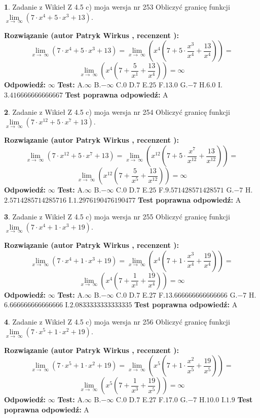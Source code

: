 \documentclass[12pt, a4paper]{article}
\theoremstyle{definition} %
\newtheorem{zad}{}
\newcommand{\zadStart}[1]{\begin{zad}#1\newline}
\newcommand{\zadStop}{\end{zad}}
\newcommand{\rozwStart}[2]{\noindent \textbf{Rozwiązanie (autor #1 , recenzent #2): }\newline}
\newcommand{\rozwStop}{\newline}
\newcommand{\odpStart}{\noindent \textbf{Odpowiedź:}\newline}
\newcommand{\odpStop}{\newline}
\newcommand{\testStart}{\noindent \textbf{Test:}\newline}
\newcommand{\testStop}{\newline}
\newcommand{\kluczStart}{\noindent \textbf{Test poprawna odpowiedź:}\newline}
\newcommand{\kluczStop}{\newline}
\begin{document}
\zadStart{Zadanie z Wikieł Z 4.5 c) moja wersja nr 253}
Obliczyć granicę funkcji  $\lim\limits_{x\to\ \infty}(7 \cdot x^{4}+5 \cdot x^{3}+13)$.
\zadStop
\rozwStart{Patryk Wirkus}{}
$$\lim\limits_{x\to\ \infty}(7 \cdot x^{4}+5 \cdot x^{3}+13) = \lim\limits_{x\to\ \infty}(x^{4}(7 +5 \cdot \frac{x^{3}}{x^{4}}+\frac{13}{x^{4}})) =$$ $$\lim\limits_{x\to\ \infty}(x^{4}(7 +\frac{5}{x^{1}}+\frac{13}{x^{4}})) =\infty$$
\rozwStop
\odpStart
$\infty$
\odpStop
\testStart
A.$\infty$ B.$-\infty$ C.$0$ D.$7$ E.$25$
F.$13.0$ G.$-7$
H.$6.0$
I.$3.416666666666667$
\testStop
\kluczStart
A
\kluczStop



\zadStart{Zadanie z Wikieł Z 4.5 c) moja wersja nr 254}
Obliczyć granicę funkcji  $\lim\limits_{x\to\ \infty}(7 \cdot x^{12}+5 \cdot x^{7}+13)$.
\zadStop
\rozwStart{Patryk Wirkus}{}
$$\lim\limits_{x\to\ \infty}(7 \cdot x^{12}+5 \cdot x^{7}+13) = \lim\limits_{x\to\ \infty}(x^{12}(7 +5 \cdot \frac{x^{7}}{x^{12}}+\frac{13}{x^{12}})) =$$ $$\lim\limits_{x\to\ \infty}(x^{12}(7 +\frac{5}{x^{5}}+\frac{13}{x^{12}})) =\infty$$
\rozwStop
\odpStart
$\infty$
\odpStop
\testStart
A.$\infty$ B.$-\infty$ C.$0$ D.$7$ E.$25$
F.$9.571428571428571$ G.$-7$
H.$2.5714285714285716$
I.$1.2976190476190477$
\testStop
\kluczStart
A
\kluczStop



\zadStart{Zadanie z Wikieł Z 4.5 c) moja wersja nr 255}
Obliczyć granicę funkcji  $\lim\limits_{x\to\ \infty}(7 \cdot x^{4}+1 \cdot x^{3}+19)$.
\zadStop
\rozwStart{Patryk Wirkus}{}
$$\lim\limits_{x\to\ \infty}(7 \cdot x^{4}+1 \cdot x^{3}+19) = \lim\limits_{x\to\ \infty}(x^{4}(7 +1 \cdot \frac{x^{3}}{x^{4}}+\frac{19}{x^{4}})) =$$ $$\lim\limits_{x\to\ \infty}(x^{4}(7 +\frac{1}{x^{1}}+\frac{19}{x^{4}})) =\infty$$
\rozwStop
\odpStart
$\infty$
\odpStop
\testStart
A.$\infty$ B.$-\infty$ C.$0$ D.$7$ E.$27$
F.$13.666666666666666$ G.$-7$
H.$6.666666666666666$
I.$2.0833333333333335$
\testStop
\kluczStart
A
\kluczStop



\zadStart{Zadanie z Wikieł Z 4.5 c) moja wersja nr 256}
Obliczyć granicę funkcji  $\lim\limits_{x\to\ \infty}(7 \cdot x^{5}+1 \cdot x^{2}+19)$.
\zadStop
\rozwStart{Patryk Wirkus}{}
$$\lim\limits_{x\to\ \infty}(7 \cdot x^{5}+1 \cdot x^{2}+19) = \lim\limits_{x\to\ \infty}(x^{5}(7 +1 \cdot \frac{x^{2}}{x^{5}}+\frac{19}{x^{5}})) =$$ $$\lim\limits_{x\to\ \infty}(x^{5}(7 +\frac{1}{x^{3}}+\frac{19}{x^{5}})) =\infty$$
\rozwStop
\odpStart
$\infty$
\odpStop
\testStart
A.$\infty$ B.$-\infty$ C.$0$ D.$7$ E.$27$
F.$17.0$ G.$-7$
H.$10.0$
I.$1.9$
\testStop
\kluczStart
A
\kluczStop
\end{document}
